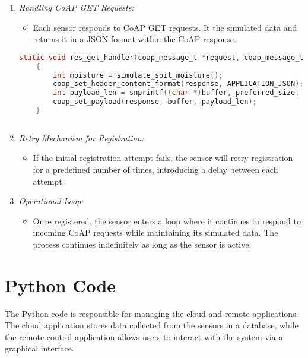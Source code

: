 \begin{enumerate}
    \item \textit{Handling CoAP GET Requests:}
          \begin{itemize}
              \item Each sensor responds to CoAP GET requests. It the simulated data and returns it in a JSON format within the CoAP response.
          \end{itemize}
          \begin{lstlisting}[language=C]
    static void res_get_handler(coap_message_t *request, coap_message_t *response, uint8_t *buffer, uint16_t preferred_size, int32_t *offset)
    {
        int moisture = simulate_soil_moisture();
        coap_set_header_content_format(response, APPLICATION_JSON);
        int payload_len = snprintf((char *)buffer, preferred_size, "{\"moisture\":%d}", moisture);
        coap_set_payload(response, buffer, payload_len);
    }
        
    \end{lstlisting}

    \item \textit{Retry Mechanism for Registration:}
          \begin{itemize}
              \item If the initial registration attempt fails, the sensor will retry registration for a predefined number of times, introducing a delay between each attempt.
          \end{itemize}

    \item \textit{Operational Loop:}
          \begin{itemize}
              \item Once registered, the sensor enters a loop where it continues to respond to incoming CoAP requests while maintaining its simulated data. The process continues indefinitely as long as the sensor is active.
          \end{itemize}

\end{enumerate}


\newpage

\section{Python Code}


The Python code is responsible for managing the cloud and remote applications. The cloud application stores data collected from the sensors in a database, while the remote control application allows users to interact with the system via a graphical interface.\\

